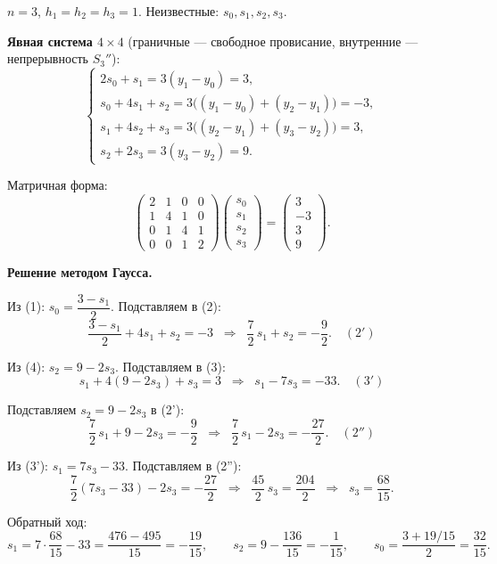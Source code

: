 $n = 3$, $h_1 = h_2 = h_3 = 1$. Неизвестные: $s_0, s_1, s_2, s_3$.

\textbf{Явная система $4 \times 4$} (граничные --- свободное провисание, внутренние --- непрерывность $S_3''$):
\[
    \begin{cases}
        2s_0 + s_1 = 3(y_1 - y_0) = 3, \\
        s_0 + 4s_1 + s_2 = 3\bigl((y_1 - y_0) + (y_2 - y_1)\bigr) = -3, \\
        s_1 + 4s_2 + s_3 = 3\bigl((y_2 - y_1) + (y_3 - y_2)\bigr) = 3, \\
        s_2 + 2s_3 = 3(y_3 - y_2) = 9.
    \end{cases}
\]

Матричная форма:
\[
    \begin{pmatrix}
        2 & 1 & 0 & 0 \\
        1 & 4 & 1 & 0 \\
        0 & 1 & 4 & 1 \\
        0 & 0 & 1 & 2
    \end{pmatrix}
    \begin{pmatrix} s_0 \\ s_1 \\ s_2 \\ s_3 \end{pmatrix}
    =
    \begin{pmatrix} 3 \\ -3 \\ 3 \\ 9 \end{pmatrix}.
\]

\textbf{Решение методом Гаусса.}

Из (1): $s_0 = \dfrac{3 - s_1}{2}$. Подставляем в (2):
\[
    \frac{3 - s_1}{2} + 4s_1 + s_2 = -3 \;\;\Longrightarrow\;\; \frac{7}{2}\,s_1 + s_2 = -\frac{9}{2}. \quad (2')
\]

Из (4): $s_2 = 9 - 2s_3$. Подставляем в (3):
\[
    s_1 + 4(9 - 2s_3) + s_3 = 3 \;\;\Longrightarrow\;\; s_1 - 7s_3 = -33. \quad (3')
\]

Подставляем $s_2 = 9 - 2s_3$ в (2'):
\[
    \frac{7}{2}\,s_1 + 9 - 2s_3 = -\frac{9}{2} \;\;\Longrightarrow\;\; \frac{7}{2}\,s_1 - 2s_3 = -\frac{27}{2}. \quad (2'')
\]

Из (3'): $s_1 = 7s_3 - 33$. Подставляем в (2''):
\[
    \frac{7}{2}(7s_3 - 33) - 2s_3 = -\frac{27}{2} \;\;\Longrightarrow\;\; \frac{45}{2}\,s_3 = \frac{204}{2} \;\;\Longrightarrow\;\; s_3 = \frac{68}{15}.
\]

Обратный ход:
\[
    s_1 = 7 \cdot \frac{68}{15} - 33 = \frac{476 - 495}{15} = -\frac{19}{15}, \qquad
    s_2 = 9 - \frac{136}{15} = -\frac{1}{15}, \qquad
    s_0 = \frac{3 + 19/15}{2} = \frac{32}{15}.
\]

